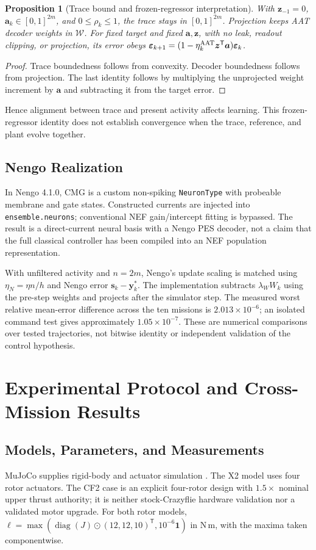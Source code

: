 \documentclass[letterpaper,10pt,conference]{IEEEtran}
\newcommand{\T}{^{\mathsf T}}
\newtheorem{proposition}{Proposition}
\begin{document}
\begin{proposition}[Trace bound and frozen-regressor interpretation]
With $\bm z_{-1}=0$, $\bm a_k\in[0,1]^{2m}$, and $0\le\rho_k\le1$,
the trace stays in $[0,1]^{2m}$. Projection keeps AAT decoder weights in
$\mathcal W$. For fixed target and fixed $\bm a,\bm z$, with no leak,
readout clipping, or projection, its error obeys
$\bm\varepsilon_{k+1}=(1-\eta_k^{\rm AAT}\bm z\T\bm a)\bm\varepsilon_k$.
\end{proposition}
\begin{proof}
Trace boundedness follows from convexity. Decoder boundedness follows
from projection. The last identity follows by multiplying the unprojected
weight increment by $\bm a$ and subtracting it from the target error.
\end{proof}
Hence alignment between trace and present activity affects learning.
This frozen-regressor identity does not establish convergence when the
trace, reference, and plant evolve together.

\subsection{Nengo Realization}
In Nengo 4.1.0, CMG is a custom non-spiking \texttt{NeuronType} with
probeable membrane and gate states. Constructed currents are injected into
\texttt{ensemble.neurons}; conventional NEF gain/intercept fitting is
bypassed. The result is a direct-current neural basis with a Nengo PES
decoder, not a claim that the full classical controller has been compiled
into an NEF population representation.

With unfiltered activity and $n=2m$, Nengo's update scaling is matched using
$\eta_N=\eta n/h$ and Nengo error $\bm s_k-\bm y_k^*$.
The implementation subtracts $\lambda_WW_k$ using the pre-step weights
and projects after the simulator step. The measured worst relative
mean-error difference across the ten missions is $2.013\times10^{-6}$;
an isolated command test gives approximately $1.05\times10^{-7}$.
These are numerical comparisons over tested trajectories, not bitwise
identity or independent validation of the control hypothesis.

\section{Experimental Protocol and Cross-Mission Results}
\label{sec:results}
\subsection{Models, Parameters, and Measurements}
MuJoCo supplies rigid-body and actuator simulation \cite{todorov2012mujoco}.
The X2 model uses four rotor actuators. The CF2 case is an explicit
four-rotor design with $1.5\times$ nominal upper thrust authority; it is
neither stock-Crazyflie hardware validation nor a validated motor upgrade.
For both rotor models,
$\bm\ell=\max(\operatorname{diag}(J)\odot(12,12,10)\T,10^{-6}\bm1)$
in N\,m, with the maxima taken componentwise.
\end{document}
